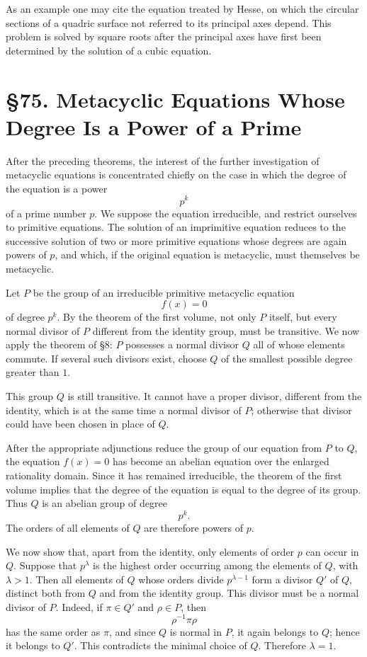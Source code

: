 \documentclass[11pt,a4paper]{book}
\newcommand{\webersection}[2]{\clearpage\section*{\S #1. #2}}
\begin{document}
As an example one may cite the equation treated by Hesse, on which the circular sections of a quadric surface not referred to its principal axes depend.  This problem is solved by square roots after the principal axes have first been determined by the solution of a cubic equation.

\webersection{75}{Metacyclic Equations Whose Degree Is a Power of a Prime}

After the preceding theorems, the interest of the further investigation of metacyclic equations is concentrated chiefly on the case in which the degree of the equation is a power
\[
 p^k
\]
of a prime number \(p\).  We suppose the equation irreducible, and restrict ourselves to primitive equations.  The solution of an imprimitive equation reduces to the successive solution of two or more primitive equations whose degrees are again powers of \(p\), and which, if the original equation is metacyclic, must themselves be metacyclic.

Let \(P\) be the group of an irreducible primitive metacyclic equation
\[
 f(x)=0
\]
of degree \(p^k\).  By the theorem of the first volume, not only \(P\) itself, but every normal divisor of \(P\) different from the identity group, must be transitive.  We now apply the theorem of \S 8: \(P\) possesses a normal divisor \(Q\) all of whose elements commute.  If several such divisors exist, choose \(Q\) of the smallest possible degree greater than \(1\).

This group \(Q\) is still transitive.  It cannot have a proper divisor, different from the identity, which is at the same time a normal divisor of \(P\); otherwise that divisor could have been chosen in place of \(Q\).

After the appropriate adjunctions reduce the group of our equation from \(P\) to \(Q\), the equation \(f(x)=0\) has become an abelian equation over the enlarged rationality domain.  Since it has remained irreducible, the theorem of the first volume implies that the degree of the equation is equal to the degree of its group.  Thus \(Q\) is an abelian group of degree
\[
 p^k .
\]
The orders of all elements of \(Q\) are therefore powers of \(p\).

We now show that, apart from the identity, only elements of order \(p\) can occur in \(Q\).  Suppose that \(p^\lambda\) is the highest order occurring among the elements of \(Q\), with \(\lambda>1\).  Then all elements of \(Q\) whose orders divide \(p^{\lambda-1}\) form a divisor \(Q'\) of \(Q\), distinct both from \(Q\) and from the identity group.  This divisor must be a normal divisor of \(P\).  Indeed, if \(\pi\in Q'\) and \(\rho\in P\), then
\[
 \rho^{-1}\pi\rho
\]
has the same order as \(\pi\), and since \(Q\) is normal in \(P\), it again belongs to \(Q\); hence it belongs to \(Q'\).  This contradicts the minimal choice of \(Q\).  Therefore \(\lambda=1\).
\end{document}
